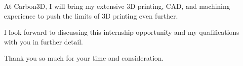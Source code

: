 \documentclass[11pt, letterpaper]{awesome-cv} %
\begin{document}
\begin{cvletter}
At Carbon3D, I will bring my extensive 3D printing, CAD, and machining experience to push the limits of 3D printing even further.

I look forward to discussing this internship opportunity and my qualifications with you in further detail. 

Thank you so much for your time and consideration.


\end{cvletter}


\makeletterclosing %
\end{document}
